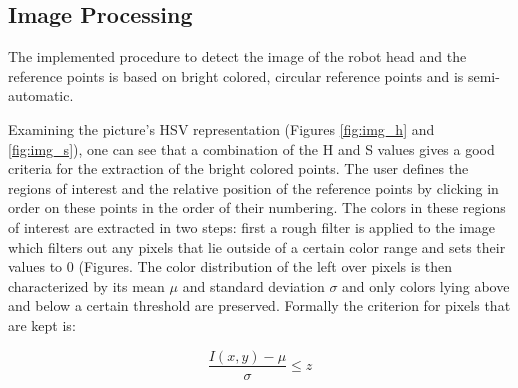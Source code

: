 \subsection{Image Processing}
\label{sec:imageprocessing}

The implemented procedure to detect the image of the robot head and the reference points is based on bright colored, circular reference points and is semi-automatic.

Examining the picture's HSV representation (Figures \ref{fig:img_h} and \ref{fig:img_s}), one can see that a combination of the H and S values gives a good criteria for the extraction of the bright colored points. 
The user defines the regions of interest and the relative position of the reference points by clicking in order on these points in the order of their numbering.
The colors in these regions of interest are extracted in two steps: first a rough filter is applied to the image which filters out any pixels that lie outside of a certain color range and sets their values to 0 (Figures. 
The color distribution of the left over pixels is then characterized by its mean $\mu$ and standard deviation $\sigma$ and only colors lying above and below a certain threshold are preserved. Formally the criterion for pixels that are kept is:

\begin{equation}
    \frac{I(x,y)-\mu}{\sigma}\leq z
\end{equation}


